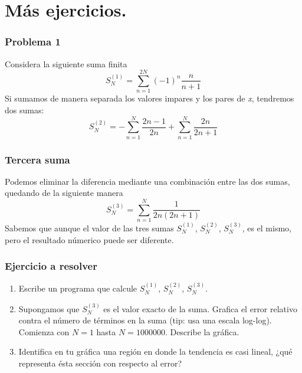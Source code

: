 \section{Más ejercicios.}
\begin{frame}
\frametitle{Problema 1}
Considera la siguiente suma finita
\begin{equation}
S^{(1)}_{N}= \sum^{2N}_{n=1} (-1)^{n} \dfrac{n}{n+1}
\end{equation}
Si sumamos de manera separada los valores impares y los pares de \textit{x}, tendremos dos sumas:
\begin{equation}
S^{(2)}_{N}= - \sum^{N}_{n=1} \dfrac{2n-1}{2n} + \sum^{N}_{n=1} \dfrac{2n}{2n+1}
\end{equation}
\end{frame}
\begin{frame}
\frametitle{Tercera suma}
Podemos eliminar la diferencia mediante una combinación entre las dos sumas, quedando de la siguiente manera
\begin{equation}
S^{(3)}_{N}=  \sum^{N}_{n=1} \dfrac{1}{2n(2n+1)}
\end{equation}
Sabemos que aunque el valor de las tres sumas $S^{(1)}_{N}$, $S^{(2)}_{N}$, $S^{(3)}_{N}$, es el mismo, pero el resultado númerico puede ser diferente.
\end{frame}
\begin{frame}
\frametitle{Ejercicio a resolver}
\begin{enumerate}
\item Escribe un programa que calcule $S^{(1)}_{N}$, $S^{(2)}_{N}$, $S^{(3)}_{N}$.
\item Supongamos que $S^{(3)}_{N}$ es el valor exacto de la suma. Grafica el error relativo contra el número de términos en la suma (tip: usa una escala log-log). Comienza con $N=1$ hasta $N=1000000$. Describe la gráfica.
\item Identifica en tu gráfica una región en donde la tendencia es casi lineal, ¿qué representa ésta sección con respecto al error?
\end{enumerate}
\end{frame}
